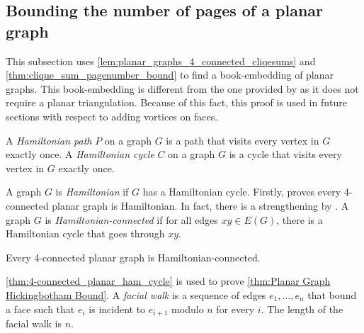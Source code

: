 \subsection{Bounding the number of pages of a planar graph}
This subsection uses \cref{lem:planar_graphs_4_connected_cliqesums} and \cref{thm:clique_sum_pagenumber_bound} to find a book-embedding of planar graphs. This book-embedding is different from the one provided by \textcite{yannakakisEmbeddingPlanarGraphs1989} as it does not require a planar triangulation. Because of this fact, this proof is used in future sections with respect to adding vortices on faces. 

A \textit{Hamiltonian path} $P$ on a graph $G$ is a path that visits every vertex in $G$ exactly once. A \textit{Hamiltonian cycle} $C$ on a graph $G$ is a cycle that visits every vertex in $G$ exactly once.  

A graph $G$ is \textit{Hamiltonian} if $G$ has a Hamiltonian cycle.
Firstly, \textcite{tutteTheoremPlanarGraphs1956} proves every $4$-connected planar graph is Hamiltonian.
In fact, there is a strengthening by \textcite{thomassenTheoremPathsPlanar1983}. A graph $G$ is \textit{Hamiltonian-connected} if for all edges $xy \in E(G)$, there is a Hamiltonian cycle that goes through $xy$. 

\begin{theorem}\label{thm:4-connected_planar_ham_cycle}
	Every 4-connected planar graph is Hamiltonian-connected.
\end{theorem}


\cref{thm:4-connected_planar_ham_cycle} is used to prove \cref{thm:Planar Graph Hickingbotham Bound}. A \textit{facial walk} is a sequence of edges \(e_1, \ldots, e_n\) that bound a face such that \(e_i\) is incident to \(e_{i + 1}\) modulo \(n\) for every \(i\). The length of the facial walk is \(n\).


